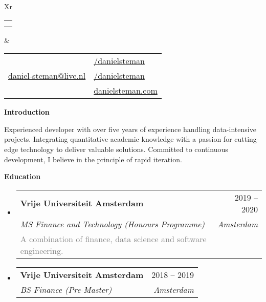 \documentclass[letterpaper,12pt]{article}[leftmargin=*]
\makeatletter
\def \fullname {Daniël Steman}
\def \subtitle {}
\def \linkedinicon {\faLinkedin}
\def \linkedinlink {https://linkedin.com/in/danielsteman/}
\def \linkedintext {/danielsteman}
\def \phoneicon {\faPhone}
\def \phonetext {+31 6 14 20 09 70}
\def \emailicon {\faEnvelope}
\def \emaillink {mailto:daniel-steman@live.nl}
\def \emailtext {daniel-steman@live.nl}
\def \githubicon {\faGithub}
\def \githublink {https://github.com/danielsteman}
\def \githubtext {/danielsteman}
\def \websiteicon {\faGlobe}
\def \websitelink {https://danielsteman.com/}
\def \websitetext {danielsteman.com}
\def \headertype {\doublecol} %
\def \entryspacing {-0pt}
\def \linkedin {\linkedinicon \hspace{3pt}\href{\linkedinlink}{\linkedintext}}
\def \phone {\phoneicon \hspace{3pt}{ \phonetext}}
\def \email {\emailicon \hspace{3pt}\href{\emaillink}{\emailtext}}
\def \github {\githubicon \hspace{3pt}\href{\githublink}{\githubtext}}
\def \website {\websiteicon \hspace{3pt}\href{\websitelink}{\websitetext}}
\renewcommand{\section}[2]{\vspace{5pt}
  \colorbox{secondary}{\color{white}\raggedbottom\normalsize\textbf{{#1}{\hspace{7pt}#2}}}
}
\newcommand{\resumeEntryStart}{\begin{itemize}[leftmargin=2.5mm]}
\newcommand{\resumeEntryEnd}{\end{itemize}\vspace{\entryspacing}}
\newcommand{\resumeEntryExtraText}[5]{
  \vspace{-1pt}\item[]
    \begin{tabularx}{0.97\textwidth}{X@{\hspace{60pt}}r}
      \textbf{\color{primary}#1} & {\firabook\color{accent}\small#2} \\
      \textit{\color{accent}\small#3} & \textit{\color{accent}\small#4} \\
      \textcolor{gray}{\small#5} & %
    \end{tabularx}\vspace{-6pt}
}
\newcommand{\resumeEntryTSDL}[4]{
  \vspace{-1pt}\item[]
    \begin{tabularx}{0.97\textwidth}{X@{\hspace{60pt}}r}
      \textbf{\color{primary}#1} & {\firabook\color{accent}\small#2} \\
      \textit{\color{accent}\small#3} & \textit{\color{accent}\small#4} \\
    \end{tabularx}\vspace{-6pt}
}
\newcommand{\doublecol}[6]{
  \begin{tabularx}{\textwidth}{Xr}
    {
      \begin{tabular}[c]{l}
        \fontsize{35}{45}\selectfont{\color{primary}{{\textbf{\fullname}}}} \\
        {\textit{\subtitle}} %
      \end{tabular}
    } & {
      \begin{tabular}[c]{l@{\hspace{1.5em}}l}
        {\small#4} & {\small#1} \\
        {\small#5} & {\small#2} \\
        {\small#6} & {\small#3}
      \end{tabular}
    }
  \end{tabularx}
}
\newcommand{\singlecol}[6]{
  \begin{tabularx}{\textwidth}{Xr}
    {
      \begin{tabular}[b]{l}
        \fontsize{35}{45}\selectfont{\color{primary}{{\textbf{\fullname}}}} \\
        {\textit{\subtitle}} %
      \end{tabular}
    } & {
      \begin{tabular}[c]{l}
        {\small#1} \\
        {\small#2} \\
        {\small#3} \\
        {\small#4} \\
        {\small#5} \\
        {\small#6}
      \end{tabular}
    }
  \end{tabularx}
}
\makeatother
\begin{document}


\headertype{\linkedin}{\github}{\website}{\phone}{\email}{} %
\vspace{-10pt} %

\section{\faGraduationCap}{Introduction}

\newcommand{\myInfo}[2]{%
    \begin{adjustwidth}{2.5mm}{}
        \vspace{2.5mm}%
        \begin{minipage}{#1} %
            {\small #2}%
        \end{minipage}%
        \vspace{2.5mm}%
    \end{adjustwidth}
}

\myInfo{18cm}{Experienced developer with over five years of experience handling data-intensive projects. Integrating quantitative academic knowledge with a passion for cutting-edge technology to deliver valuable solutions. Committed to continuous development, I believe in the principle of rapid iteration.}


\section{\faGraduationCap}{Education}

  \resumeEntryStart
    \resumeEntryExtraText
    {Vrije Universiteit Amsterdam}{2019 -- 2020}
    {MS Finance and Technology (Honours Programme)}{Amsterdam}
    {A combination of finance, data science and software engineering.}
  \resumeEntryEnd

  \resumeEntryStart
    \resumeEntryTSDL
      {Vrije Universiteit Amsterdam}{2018 -- 2019}
      {BS Finance (Pre-Master)}{Amsterdam}
  \resumeEntryEnd
\end{document}
